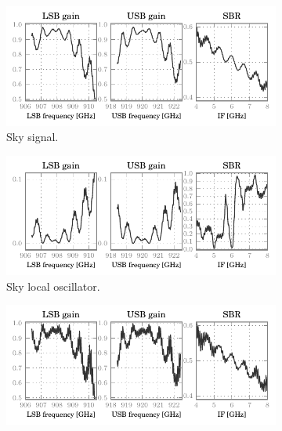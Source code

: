 \begin{figure}[p]
    \centering
    \begin{subfigure}[b]{\textwidth}
        \centering
        \includegraphics[scale=.9]{87_00_00_sky_s_lsbusbsbr}
        \vspace{-.8em}
        \caption{Sky signal.}
    \end{subfigure}
    \begin{subfigure}[b]{\textwidth}
        \centering
        \includegraphics[scale=.9]{87_00_00_sky_l_lsbusbsbr}
        \vspace{-.8em}
        \caption{Sky local oscillator.}
    \end{subfigure}
    \begin{subfigure}[b]{\textwidth}
        \centering
        \includegraphics[scale=.9]{87_00_00_hbb_s_lsbusbsbr}

\end{subfigure}
\end{figure}
